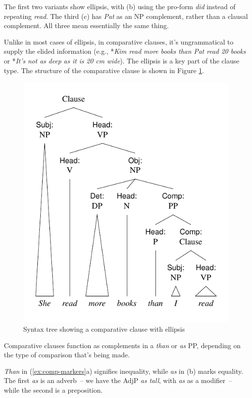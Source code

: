 The first two variants show ellipsis, with (b) using the pro-form \textit{did} instead of repeating \textit{read}. The third (c) has \textit{Pat} as an NP complement, rather than a clausal complement. All three mean essentially the same thing.

Unlike in most cases of ellipsis, in comparative clauses, it's ungrammatical to supply the elided information (e.g., *\textit{Kim read more books than Pat read 20 books} or *\textit{It's not as deep as it is 20 cm wide}). The ellipsis is a key part of the clause type. The structure of the comparative clause is shown in Figure \ref{fig:comp-tree}.

\begin{figure}
    \centering
    \includegraphics[width=0.7\linewidth]{figures/she read more books than I read.pdf}
    \caption{Syntax tree showing a comparative clause with ellipsis}\label{fig:comp-tree}
\end{figure}

Comparative clauses function as complements in a \textit{than} or \textit{as} PP, depending on the type of comparison that's being made.

\ea \label{ex:comp-markers}
    \z
\z

\textit{Than} in (\ref{ex:comp-markers}a) signifies inequality, while \textit{as} in (b) marks equality. The first \textit{as} is an adverb~-- we have the AdjP \textit{as tall}, with \textit{as} as a modifier~-- while the second is a preposition.

